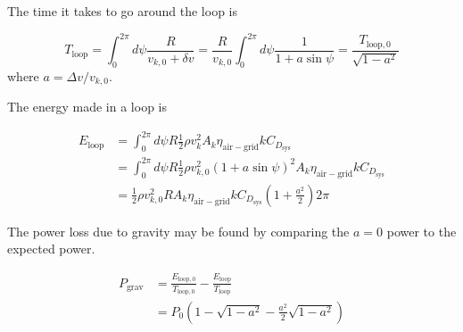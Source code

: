 \documentclass[11pt]{amsart}
\newcommand{\airgrid}{\mathrm{air-grid}}
\newcommand{\grav}{\mathrm{grav}}
\newcommand{\kite}{k}
\newcommand{\lp}{\mathrm{loop}}
\newcommand{\sys}{\mathrm{sys}}
\begin{document}
The time it takes to go around the loop is

\begin{equation}
  T_{\lp} = \int_0^{2 \pi} d\psi \frac{R}{v_{\kite,0} + \delta v}
          = \frac{R}{v_{\kite,0}} \int_0^{2 \pi} d\psi \frac{1}{1 + a \sin \psi}
          = \frac{T_{\lp,0}}{\sqrt{1 - a^2}}
\end{equation}
%
where $a = \Delta v / v_{\kite,0}$.

The energy made in a loop is

\begin{align}
  E_{\lp} &= \int_0^{2 \pi} d\psi R \frac{1}{2} \rho v_{\kite}^2 A_{\kite} \eta_{\airgrid} k C_{D_{\sys}} \\
          &= \int_0^{2 \pi} d\psi R \frac{1}{2} \rho v_{\kite,0}^2 (1 + a \sin \psi)^2 A_{\kite} \eta_{\airgrid}k C_{D_{\sys}} \\
          &= \frac{1}{2} \rho v_{\kite,0}^2 R A_{\kite} \eta_{\airgrid} k C_{D_{\sys}} \left(1 + \frac{a^2}{2} \right) 2 \pi
\end{align}

The power loss due to gravity may be found by comparing the $a=0$
power to the expected power.

\begin{align}
  P_{\grav} &= \frac{E_{\lp,0}}{T_{\lp,0}} - \frac{E_{\lp}}{T_{\lp}} \\
            &= P_0 \left( 1 - \sqrt{1 - a^2} - \frac{a^2}{2} \sqrt{1 - a^2} \right)
\end{align}
\end{document}
